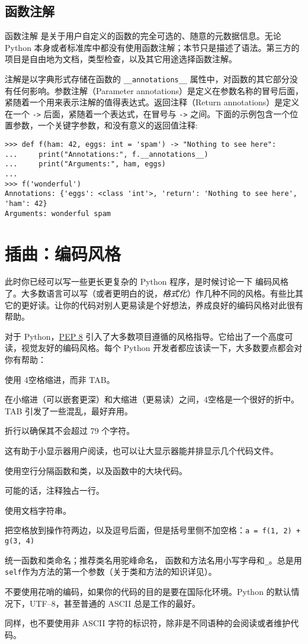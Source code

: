 \subsection{函数注解}
函数注解 是关于用户自定义的函数的完全可选的、随意的元数据信息。无论 Python 本身或者标准库中都没有使用函数注解；本节只是描述了语法。第三方的项目是自由地为文档，类型检查，以及其它用途选择函数注解。

注解是以字典形式存储在函数的 \verb|__annotations__| 属性中，对函数的其它部分没有任何影响。参数注解（Parameter annotations）是定义在参数名称的冒号后面，紧随着一个用来表示注解的值得表达式。返回注释（Return annotations）是定义在一个 \Verb|->| 后面，紧随着一个表达式，在冒号与 \Verb|->| 之间。下面的示例包含一个位置参数，一个关键字参数，和没有意义的返回值注释:
\begin{lstlisting}
>>> def f(ham: 42, eggs: int = 'spam') -> "Nothing to see here":
...     print("Annotations:", f.__annotations__)
...     print("Arguments:", ham, eggs)
...
>>> f('wonderful')
Annotations: {'eggs': <class 'int'>, 'return': 'Nothing to see here', 'ham': 42}
Arguments: wonderful spam
\end{lstlisting}
\section{插曲：编码风格}
此时你已经可以写一些更长更复杂的 Python 程序，是时候讨论一下 编码风格 了。大多数语言可以写（或者更明白的说，\emph{格式化}）作几种不同的风格。有些比其它的更好读。让你的代码对别人更易读是个好想法，养成良好的编码风格对此很有帮助。

对于 Python，\href{https://www.python.org/dev/peps/pep-0008/}{PEP 8} 引入了大多数项目遵循的风格指导。它给出了一个高度可读，视觉友好的编码风格。每个 Python 开发者都应该读一下，大多数要点都会对你有帮助：
\begin{compactitem}
  \item 使用 4空格缩进，而非 TAB。

        在小缩进（可以嵌套更深）和大缩进（更易读）之间，4空格是一个很好的折中。TAB 引发了一些混乱，最好弃用。
  \item 折行以确保其不会超过 79 个字符。

        这有助于小显示器用户阅读，也可以让大显示器能并排显示几个代码文件。
  \item 使用空行分隔函数和类，以及函数中的大块代码。
  \item 可能的话，注释独占一行。
  \item 使用文档字符串。
  \item 把空格放到操作符两边，以及逗号后面，但是括号里侧不加空格：\texttt{a = f(1, 2) + g(3, 4)}
  \item 统一函数和类命名；推荐类名用驼峰命名， 函数和方法名用小写字母和\verb|_|。总是用 \texttt{self}作为方法的第一个参数（关于类和方法的知识详见）。
  \item 不要使用花哨的编码，如果你的代码的目的是要在国际化环境。Python 的默认情况下，UTF--8，甚至普通的 ASCII 总是工作的最好。
  \item 同样，也不要使用非 ASCII 字符的标识符，除非是不同语种的会阅读或者维护代码。
\end{compactitem}
